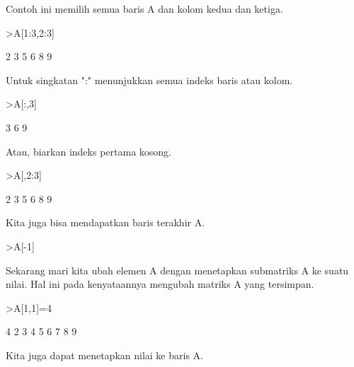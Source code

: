 \documentclass[a4paper,10pt]{article}
\begin{document}
\begin{eulernotebook}
\begin{eulercomment}
\begin{eulercomment}
\begin{eulercomment}
\begin{eulercomment}
\begin{eulercomment}
\begin{eulercomment}
\begin{eulercomment}
Contoh ini memilih semua baris A dan kolom kedua dan ketiga.
\end{eulercomment}
\begin{eulerprompt}
>A[1:3,2:3]
\end{eulerprompt}
\begin{euleroutput}
              2             3 
              5             6 
              8             9 
\end{euleroutput}
\begin{eulercomment}
Untuk singkatan ":" menunjukkan semua indeks baris atau kolom.
\end{eulercomment}
\begin{eulerprompt}
>A[:,3]
\end{eulerprompt}
\begin{euleroutput}
              3 
              6 
              9 
\end{euleroutput}
\begin{eulercomment}
Atau, biarkan indeks pertama kosong.
\end{eulercomment}
\begin{eulerprompt}
>A[,2:3]
\end{eulerprompt}
\begin{euleroutput}
              2             3 
              5             6 
              8             9 
\end{euleroutput}
\begin{eulercomment}
Kita juga bisa mendapatkan baris terakhir A.
\end{eulercomment}
\begin{eulerprompt}
>A[-1]
\end{eulerprompt}
\begin{euleroutput}
  [7,  8,  9]
\end{euleroutput}
\begin{eulercomment}
Sekarang mari kita ubah elemen A dengan menetapkan submatriks A ke
suatu nilai. Hal ini pada kenyataannya mengubah matriks A yang
tersimpan.
\end{eulercomment}
\begin{eulerprompt}
>A[1,1]=4
\end{eulerprompt}
\begin{euleroutput}
              4             2             3 
              4             5             6 
              7             8             9 
\end{euleroutput}
\begin{eulercomment}
Kita juga dapat menetapkan nilai ke baris A.

\end{eulercomment}
\end{eulercomment}
\end{eulercomment}
\end{eulercomment}
\end{eulercomment}
\end{eulercomment}
\end{eulercomment}
\end{eulernotebook}
\end{document}
